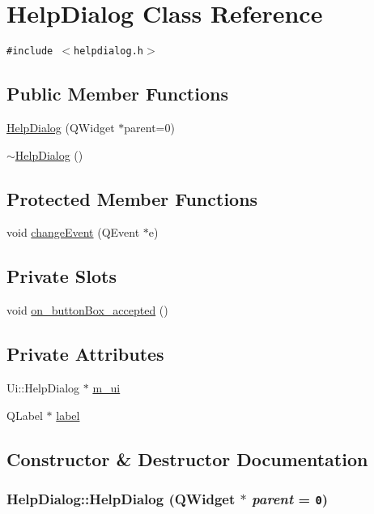 \hypertarget{class_help_dialog}{
\section{HelpDialog Class Reference}
\label{class_help_dialog}
}
{\tt \#include $<$helpdialog.h$>$}

\subsection*{Public Member Functions}
\begin{CompactItemize}
\item 
\hyperlink{class_help_dialog_b2cdaaff98141da0157b317e8a233e0f}{HelpDialog} (QWidget $\ast$parent=0)
\item 
\hyperlink{class_help_dialog_c5a870136e6629b27f4dc99878359ab5}{$\sim$HelpDialog} ()
\end{CompactItemize}
\subsection*{Protected Member Functions}
\begin{CompactItemize}
\item 
void \hyperlink{class_help_dialog_ab243e3386d5f9758a8dc759bfb2ad04}{changeEvent} (QEvent $\ast$e)
\end{CompactItemize}
\subsection*{Private Slots}
\begin{CompactItemize}
\item 
void \hyperlink{class_help_dialog_d37498b43165a28bf0adbc40d3c84da4}{on\_\-buttonBox\_\-accepted} ()
\end{CompactItemize}
\subsection*{Private Attributes}
\begin{CompactItemize}
\item 
Ui::HelpDialog $\ast$ \hyperlink{class_help_dialog_4c28b4e05b03e891e45dccb0709c0b51}{m\_\-ui}
\item 
QLabel $\ast$ \hyperlink{class_help_dialog_fc61068e18c599f9326b4b3b90957a6c}{label}
\end{CompactItemize}


\subsection{Constructor \& Destructor Documentation}
\hypertarget{class_help_dialog_b2cdaaff98141da0157b317e8a233e0f}{
\subsubsection[{HelpDialog}]{\setlength{\rightskip}{0pt plus 5cm}HelpDialog::HelpDialog (QWidget $\ast$ {\em parent} = {\tt 0})}}
\label{class_help_dialog_b2cdaaff98141da0157b317e8a233e0f}


